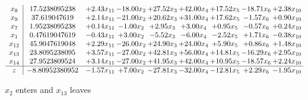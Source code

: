 \documentclass[8pt]{article}
\begin{document}
 \[\begin{array}{c| c c@{\hskip 2pt} c@{\hskip 2pt} c@{\hskip 2pt} c@{\hskip 2pt} c@{\hskip 2pt} c@{\hskip 2pt} c@{\hskip 2pt} }
 x_{8}   &  17.5238095238 & +  2.43 x_{11} & -18.00 x_{2} & + 27.52 x_{3} & + 42.00 x_{4} & + 17.52 x_{5} & -18.71 x_{6} & +  2.38 x_{10}\\
 x_{9}   &  37.619047619 & +  2.14 x_{11} & -21.00 x_{2} & + 20.62 x_{3} & + 31.00 x_{4} & + 17.62 x_{5} & -1.57 x_{6} & +  0.90 x_{10}\\
 x_{7}   &  1.95238095238 & +  0.14 x_{11} & -1.00 x_{2} & +  2.95 x_{3} & +  3.00 x_{4} & +  0.95 x_{5} & -0.57 x_{6} & +  0.24 x_{10}\\
 x_{1}   &  0.47619047619 & -0.43 x_{11} & +  3.00 x_{2} & -5.52 x_{3} & -6.00 x_{4} & -2.52 x_{5} & +  1.71 x_{6} & -0.38 x_{10}\\
 x_{12}   &  45.9047619048 & +  2.29 x_{11} & -26.00 x_{2} & + 24.90 x_{3} & + 24.00 x_{4} & +  5.90 x_{5} & +  0.86 x_{6} & +  1.48 x_{10}\\
 x_{13}   &  23.8095238095 & +  3.57 x_{11} & -27.00 x_{2} & + 42.81 x_{3} & + 56.00 x_{4} & + 14.81 x_{5} & -16.29 x_{6} & +  2.95 x_{10}\\
 x_{14}   &  27.9523809524 & +  3.14 x_{11} & -27.00 x_{2} & + 41.95 x_{3} & + 42.00 x_{4} & + 10.95 x_{5} & -18.57 x_{6} & +  2.24 x_{10}\\
\hline
z    &  -8.80952380952 & -1.57 x_{11} & +  7.00 x_{2} & -27.81 x_{3} & -32.00 x_{4} & -12.81 x_{5} & +  2.29 x_{6} & -1.95 x_{10}\\
\end{array}\]


 $ x_{2} $ enters and $ x_{13} $ leaves 
\end{document}
